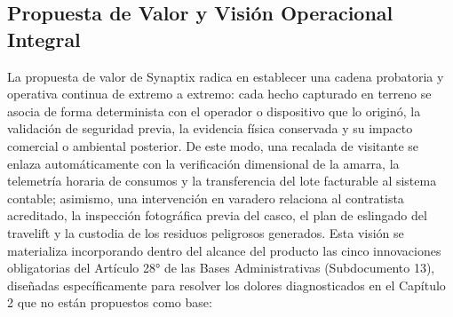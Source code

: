 \subsection{Propuesta de Valor y Visión Operacional Integral}
La propuesta de valor de Synaptix radica en establecer una cadena probatoria y operativa continua de extremo a extremo: cada hecho capturado en terreno se asocia de forma determinista con el operador o dispositivo que lo originó, la validación de seguridad previa, la evidencia física conservada y su impacto comercial o ambiental posterior. De este modo, una recalada de visitante se enlaza automáticamente con la verificación dimensional de la amarra, la telemetría horaria de consumos y la transferencia del lote facturable al sistema contable; asimismo, una intervención en varadero relaciona al contratista acreditado, la inspección fotográfica previa del casco, el plan de eslingado del travelift y la custodia de los residuos peligrosos generados.
Esta visión se materializa incorporando dentro del alcance del producto las cinco innovaciones obligatorias del Artículo 28° de las Bases Administrativas (Subdocumento 13), diseñadas específicamente para resolver los dolores diagnosticados en el Capítulo 2 que no están propuestos como base:
